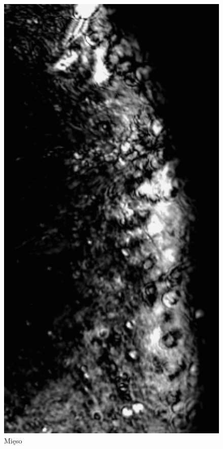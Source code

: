 \documentclass[a4paper,12pt]{article}
\begin{document}
\begin{figure} [H]
  \begin{center}
    \includegraphics[width = 15cm]{data/5MIES3J.png}
    \caption{Mięso}
  \end{center}
\end{figure}
\end{document}
